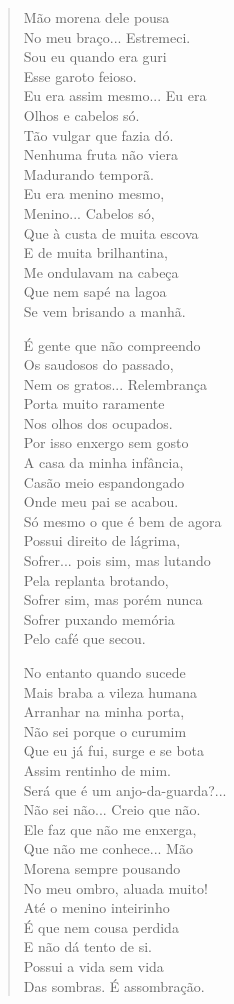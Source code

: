 \begin{verse}
Mão morena dele pousa\\
No meu braço... Estremeci.\\
Sou eu quando era guri\\
Esse garoto feioso.\\
Eu era assim mesmo... Eu era\\
Olhos e cabelos só.\\
Tão vulgar que fazia dó.\\
Nenhuma fruta não viera\\
Madurando temporã.\\
Eu era menino mesmo,\\
Menino... Cabelos só,\\
Que à custa de muita escova\\
E de muita brilhantina,\\
Me ondulavam na cabeça\\
Que nem sapé na lagoa\\
Se vem brisando a manhã.

É gente que não compreendo\\
Os saudosos do passado,\\
Nem os gratos... Relembrança\\
Porta muito raramente\\
Nos olhos dos ocupados.\\
Por isso enxergo sem gosto\\
A casa da minha infância,\\
Casão meio espandongado\\
Onde meu pai se acabou.\\
Só mesmo o que é bem de agora\\
Possui direito de lágrima,\\
Sofrer... pois sim, mas lutando\\
Pela replanta brotando,\\
Sofrer sim, mas porém nunca\\
Sofrer puxando memória\\
Pelo café que secou.

No entanto quando sucede\\
Mais braba a vileza humana\\
Arranhar na minha porta,\\
Não sei porque o curumim\\
Que eu já fui, surge e se bota\\
Assim rentinho de mim.\\
Será que é um anjo-da-guarda?...\\
Não sei não... Creio que não.\\
Ele faz que não me enxerga,\\
Que não me conhece... Mão\\
Morena sempre pousando\\
No meu ombro, aluada muito!\\
Até o menino inteirinho\\
É que nem cousa perdida\\
E não dá tento de si.\\
Possui a vida sem vida\\
Das sombras. É assombração.


\end{verse}
